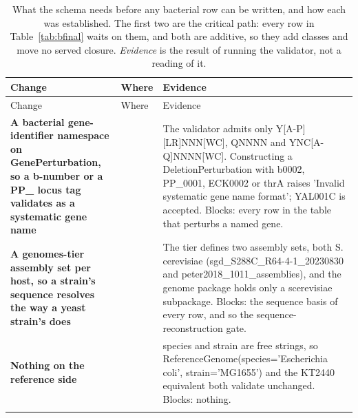 \begingroup
\footnotesize
\begin{longtable}{@{}L{52mm} L{46mm} L{72mm}@{}}
\caption[]{What the schema needs before any bacterial row can be written, and how each
was established. The first two are the critical path: every row in
Table~\ref{tab:bfinal} waits on them, and both are additive, so they add classes and
move no served closure. \emph{Evidence} is the result of running the validator, not a
reading of it.}
\label{tab:bschema}\\
\toprule
Change & Where & Evidence \\
\midrule
\endfirsthead
\toprule
Change & Where & Evidence \\
\midrule
\endhead
\bottomrule
\endfoot
\textbf{A bacterial gene-identifier namespace on GenePerturbation, so a b-number or a PP\_ locus tag validates as a systematic gene name} &  & The validator admits only Y[A-P][LR]NNN[WC], QNNNN and YNC[A-Q]NNNN[WC]. Constructing a DeletionPerturbation with b0002, PP\_0001, ECK0002 or thrA raises 'Invalid systematic gene name format'; YAL001C is accepted. Blocks: every row in the table that perturbs a named gene. \\
\addlinespace[5pt]
\textbf{A genomes-tier assembly set per host, so a strain's sequence resolves the way a yeast strain's does} &  & The tier defines two assembly sets, both S. cerevisiae (sgd\_S288C\_R64-4-1\_20230830 and peter2018\_1011\_assemblies), and the genome package holds only a scerevisiae subpackage. Blocks: the sequence basis of every row, and so the sequence-reconstruction gate. \\
\addlinespace[5pt]
\textbf{Nothing on the reference side} &  & species and strain are free strings, so ReferenceGenome(species='Escherichia coli', strain='MG1655') and the KT2440 equivalent both validate unchanged. Blocks: nothing. \\
\addlinespace[5pt]
\end{longtable}
\endgroup

